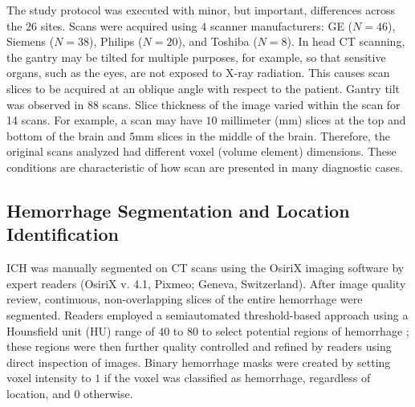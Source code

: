 \documentclass{elsarticle_nonatbib}\usepackage[]{graphicx}\usepackage[]{color}
\begin{document}
The study protocol was executed with minor, but important, differences across the $26$ sites.  Scans were acquired using $4$ scanner manufacturers: GE ($N=46$),  Siemens ($N=38$),  Philips ($N=20$),  and Toshiba ($N=8$).   In head CT scanning, the gantry may be tilted for multiple purposes, for example, so that sensitive organs, such as the eyes, are not exposed to X-ray radiation.  This causes scan slices to be acquired at an oblique angle with respect to the patient.  Gantry tilt was observed in $88$ scans.
Slice thickness of the image varied within the scan for 14 scans.
For example, a scan may have $10$ millimeter (mm) slices at the top and bottom of the brain and $5$mm slices in the middle of the brain.  Therefore, the original scans analyzed had different voxel (volume element) dimensions.  These conditions are characteristic of how scan are presented in many diagnostic cases.



\subsection{Hemorrhage Segmentation and Location Identification}
ICH was manually segmented on CT scans using the OsiriX imaging software by expert readers (OsiriX v. 4.1, Pixmeo; Geneva, Switzerland).  After image quality review, continuous, non-overlapping slices of the entire hemorrhage were segmented.  Readers employed a semiautomated threshold-based approach using a Hounsfield unit (HU) range of $40$ to $80$ to select potential regions of hemorrhage \citep{bergstrom_variation_1977, smith_imaging_2006}; these regions were then further quality controlled and refined by readers using direct inspection of images.  Binary hemorrhage masks were created by setting voxel intensity to $1$ if the voxel was classified as hemorrhage, regardless of location, and $0$ otherwise.
\end{document}

